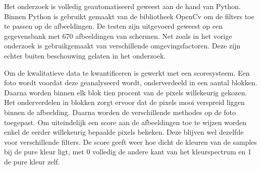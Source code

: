Het onderzoek is volledig geautomatiseerd geweest aan de hand van Python. Binnen Python is gebruikt gemaakt van de bibliotheek OpenCv om de filters toe te passen op de afbeeldingen. \cite{opencv} De testen zijn uitgevoerd geweest op een gegevensbank met 670 afbeeldingen van schermen. Net zoals in het vorige onderzoek is gebruikgemaakt van verschillende omgevingsfactoren. Deze zijn echter buiten beschouwing gelaten in het onderzoek. 

Om de kwalitatieve data te kwantificeren is gewerkt met een scoresysteem. Een foto wordt voordat deze geanalyseerd wordt, onderverdeeld in een aantal blokken. Daarna worden binnen elk blok tien procent van de pixels willekeurig gekozen. Het onderverdelen in blokken zorgt ervoor dat de pixels mooi verspreid liggen binnen de afbeelding. Daarna worden de verschillende methodes op de foto toegepast. Om uiteindelijk een score aan de afbeeldingen toe te wijzen worden enkel de eerder willekeurig bepaalde pixels bekeken. Deze blijven wel dezelfde voor verschillende filters. De score geeft weer hoe dicht de kleuren van de samples bij de pure kleur ligt, met 0 volledig de andere kant van het kleurspectrum en 1 de pure kleur zelf.